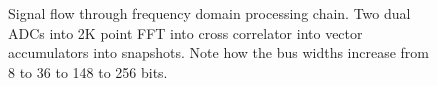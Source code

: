 \begin{landscape}
  \thispagestyle{empty}
  \begin{figure}
  \centering
  \caption{Signal flow through frequency domain processing chain. Two dual ADCs into 2K point FFT into cross correlator into vector accumulators into snapshots. Note how the bus widths increase from 8 to 36 to 148 to 256 bits.}
  \label{fig:roach-dev-frequency-domain-chain}
  \end{figure}
\end{landscape}
